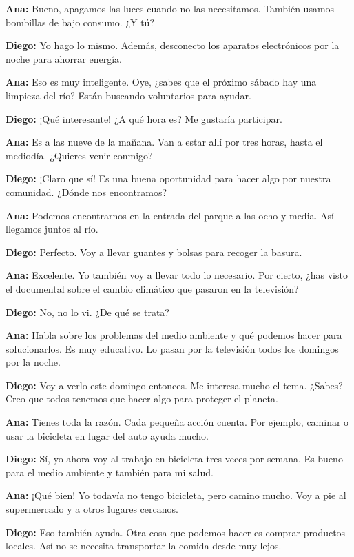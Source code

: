 \documentclass[12pt,a4paper]{article}
\begin{document}
\textbf{Ana:} Bueno, apagamos las luces cuando no las necesitamos. También usamos bombillas de bajo consumo. ¿Y tú?

\textbf{Diego:} Yo hago lo mismo. Además, desconecto los aparatos electrónicos por la noche para ahorrar energía.

\textbf{Ana:} Eso es muy inteligente. Oye, ¿sabes que el próximo sábado hay una limpieza del río? Están buscando voluntarios para ayudar.

\textbf{Diego:} ¡Qué interesante! ¿A qué hora es? Me gustaría participar.

\textbf{Ana:} Es a las nueve de la mañana. Van a estar allí por tres horas, hasta el mediodía. ¿Quieres venir conmigo?

\textbf{Diego:} ¡Claro que sí! Es una buena oportunidad para hacer algo por nuestra comunidad. ¿Dónde nos encontramos?

\textbf{Ana:} Podemos encontrarnos en la entrada del parque a las ocho y media. Así llegamos juntos al río.

\textbf{Diego:} Perfecto. Voy a llevar guantes y bolsas para recoger la basura.

\textbf{Ana:} Excelente. Yo también voy a llevar todo lo necesario. Por cierto, ¿has visto el documental sobre el cambio climático que pasaron en la televisión?

\textbf{Diego:} No, no lo vi. ¿De qué se trata?

\textbf{Ana:} Habla sobre los problemas del medio ambiente y qué podemos hacer para solucionarlos. Es muy educativo. Lo pasan por la televisión todos los domingos por la noche.

\textbf{Diego:} Voy a verlo este domingo entonces. Me interesa mucho el tema. ¿Sabes? Creo que todos tenemos que hacer algo para proteger el planeta.

\textbf{Ana:} Tienes toda la razón. Cada pequeña acción cuenta. Por ejemplo, caminar o usar la bicicleta en lugar del auto ayuda mucho.

\textbf{Diego:} Sí, yo ahora voy al trabajo en bicicleta tres veces por semana. Es bueno para el medio ambiente y también para mi salud.

\textbf{Ana:} ¡Qué bien! Yo todavía no tengo bicicleta, pero camino mucho. Voy a pie al supermercado y a otros lugares cercanos.

\textbf{Diego:} Eso también ayuda. Otra cosa que podemos hacer es comprar productos locales. Así no se necesita transportar la comida desde muy lejos.
\end{document}
